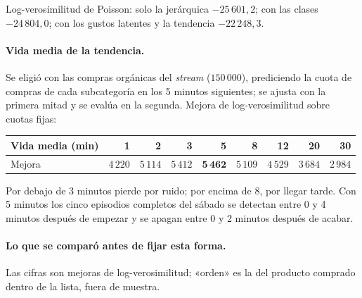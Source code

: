 \documentclass[11pt,a4paper]{article}
\begin{document}
Log-verosimilitud de Poisson: solo la jerárquica $-25\,601{,}2$; con las clases $-24\,804{,}0$; con los
gustos latentes y la tendencia $-22\,248{,}3$.

\paragraph{Vida media de la tendencia.} Se eligió con las compras orgánicas del \emph{stream}
($150\,000$), prediciendo la cuota de compras de cada subcategoría en los 5 minutos siguientes; se
ajusta con la primera mitad y se evalúa en la segunda. Mejora de log-verosimilitud sobre cuotas fijas:

\begin{center}
\small
\begin{tabular}{lrrrrrrrr}
\toprule
Vida media (min) & 1 & 2 & 3 & 5 & 8 & 12 & 20 & 30\\
\midrule
Mejora & $4\,220$ & $5\,114$ & $5\,412$ & $\mathbf{5\,462}$ & $5\,109$ & $4\,529$ & $3\,684$ & $2\,984$\\
\bottomrule
\end{tabular}
\end{center}

Por debajo de 3 minutos pierde por ruido; por encima de 8, por llegar tarde. Con 5 minutos los cinco
episodios completos del sábado se detectan entre 0 y 4 minutos después de empezar y se apagan entre 0 y
2 minutos después de acabar.

\paragraph{Lo que se comparó antes de fijar esta forma.} Las cifras son mejoras de log-verosimilitud;
«orden» es la del producto comprado dentro de la lista, fuera de muestra.
\end{document}
